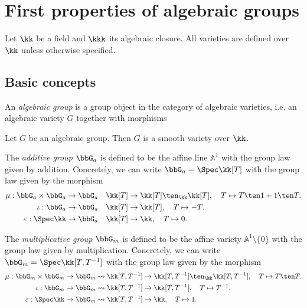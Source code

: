 \section{First properties of algebraic groups}

Let \(\kk\) be a field and \(\kkk\) its algebraic closure. 
All varieties are defined over \(\kk\) unless otherwise specified.

\subsection{Basic concepts}

    \begin{definition}\label{def:algebraic_group}
        An \emph{algebraic group} is a group object in the category of algebraic varieties, i.e. an algebraic variety $G$ together with morphisms
    \end{definition}

    \begin{proposition}\label{prop:algebraic_group_is_smooth}
        Let \(G\) be an algebraic group.
        Then \(G\) is a smooth variety over \(\kk\).
    \end{proposition}

    \begin{example}\label{eg:additive_group}
        The \emph{additive group} $\bbG_a$ is defined to be the affine line $\mathbb{A}^1$ with the group law given by addition.
        Concretely, we can write $\bbG_a = \Spec \kk[T]$ with the group law given by the morphism
        \begin{align*}
            \mu:\bbG_a \times \bbG_a \to \bbG_a \quad & \kk[T] \to \kk[T]\ten_\kk \kk[T], \quad T \mapsto T\ten 1 + 1 \ten T. \\
            \iota:\bbG_a \to \bbG_a \quad & \kk[T] \to \kk[T], \quad T \mapsto -T. \\
            \varepsilon:\Spec \kk \to \bbG_a \quad & \kk[T] \to \kk, \quad T \mapsto 0.
        \end{align*}
    \end{example}

    \begin{example}\label{eg:multiplicative_group}
        The \emph{multiplicative group} $\bbG_m$ is defined to be the affine variety $\mathbb{A}^1 \setminus \{0\}$ with the group law given by multiplication.
        Concretely, we can write $\bbG_m = \Spec \kk[T,T^{-1}]$ with the group law given by the morphism
        \begin{align*}
            \mu: \bbG_m \times \bbG_m \to \bbG_m & \leadsto \kk[T,T^{-1}] \to \kk[T,T^{-1}]\ten_\kk \kk[T,T^{-1}], \quad T \mapsto T\ten T. \\
            \iota: \bbG_m \to \bbG_m & \leadsto \kk[T,T^{-1}] \to \kk[T,T^{-1}], \quad T \mapsto T^{-1}. \\
            \varepsilon: \Spec \kk \to \bbG_m & \leadsto \kk[T,T^{-1}] \to \kk, \quad T \mapsto 1.
        \end{align*}
    \end{example}

